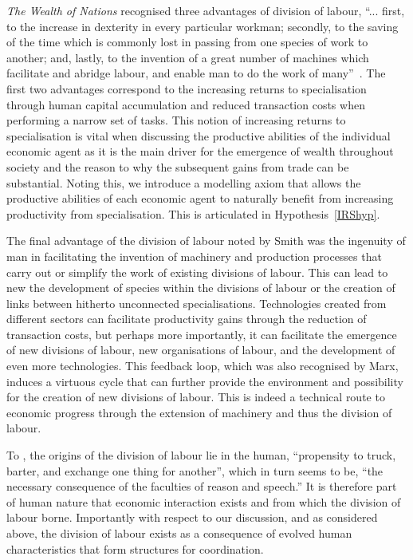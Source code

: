 \emph{The Wealth of Nations} recognised three advantages of division of labour, ``... first, to the increase in dexterity in every particular workman; secondly, to the saving of the time which is commonly lost in passing from one species of work to another; and, lastly, to the invention of a great number of machines which facilitate and abridge labour, and enable man to do the work of many''~\citep[p.~7]{Smith1776}. The first two advantages correspond to the increasing returns to specialisation through human capital accumulation and reduced transaction costs when performing a narrow set of tasks. This notion of increasing returns to specialisation is vital when discussing the productive abilities of the individual economic agent as it is the main driver for the emergence of wealth throughout society and the reason to why the subsequent gains from trade can be substantial. Noting this, we introduce a modelling axiom that allows the productive abilities of each economic agent to naturally benefit from increasing productivity from specialisation. This is articulated in Hypothesis~\ref{IRShyp}.

The final advantage of the division of labour noted by Smith was the ingenuity of man in facilitating the invention of machinery and production processes that carry out or simplify the work of existing divisions of labour. This can lead to new the development of species within the divisions of labour or the creation of links between hitherto unconnected specialisations. Technologies created from different sectors can facilitate productivity gains through the reduction of transaction costs, but perhaps more importantly, it can facilitate the emergence of new divisions of labour, new organisations of labour, and the development of even more technologies. This feedback loop, which was also recognised by Marx, induces a virtuous cycle that can further provide the environment and possibility for the creation of new divisions of labour. This is indeed a technical route to economic progress through the extension of machinery and thus the division of labour.

To \citet[p.~13]{Smith1776}, the origins of the division of labour lie in the human, ``propensity to truck, barter, and exchange one thing for another'', which in turn seems to be, ``the necessary consequence of the faculties of reason and speech.'' It is therefore part of human nature that economic interaction exists and from which the division of labour borne. Importantly with respect to our discussion, and as considered above, the division of labour exists as a consequence of evolved human characteristics that form structures for coordination.

